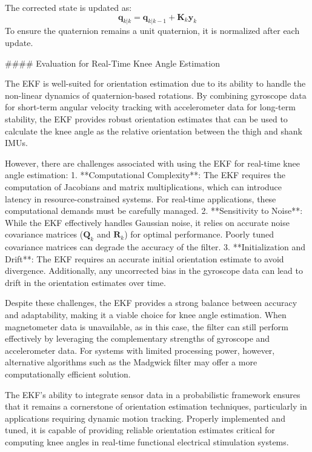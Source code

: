 The corrected state is updated as:
\[
\mathbf{q}_{k|k} = \mathbf{q}_{k|k-1} + \mathbf{K}_k \mathbf{y}_k
\]
To ensure the quaternion remains a unit quaternion, it is normalized after each update.

#### Evaluation for Real-Time Knee Angle Estimation

The EKF is well-suited for orientation estimation due to its ability to handle the non-linear dynamics of quaternion-based rotations. By combining gyroscope data for short-term angular velocity tracking with accelerometer data for long-term stability, the EKF provides robust orientation estimates that can be used to calculate the knee angle as the relative orientation between the thigh and shank IMUs.

However, there are challenges associated with using the EKF for real-time knee angle estimation:
1. **Computational Complexity**: The EKF requires the computation of Jacobians and matrix multiplications, which can introduce latency in resource-constrained systems. For real-time applications, these computational demands must be carefully managed.
2. **Sensitivity to Noise**: While the EKF effectively handles Gaussian noise, it relies on accurate noise covariance matrices (\( \mathbf{Q}_k \) and \( \mathbf{R}_k \)) for optimal performance. Poorly tuned covariance matrices can degrade the accuracy of the filter.
3. **Initialization and Drift**: The EKF requires an accurate initial orientation estimate to avoid divergence. Additionally, any uncorrected bias in the gyroscope data can lead to drift in the orientation estimates over time.

Despite these challenges, the EKF provides a strong balance between accuracy and adaptability, making it a viable choice for knee angle estimation. When magnetometer data is unavailable, as in this case, the filter can still perform effectively by leveraging the complementary strengths of gyroscope and accelerometer data. For systems with limited processing power, however, alternative algorithms such as the Madgwick filter may offer a more computationally efficient solution.

The EKF’s ability to integrate sensor data in a probabilistic framework ensures that it remains a cornerstone of orientation estimation techniques, particularly in applications requiring dynamic motion tracking. Properly implemented and tuned, it is capable of providing reliable orientation estimates critical for computing knee angles in real-time functional electrical stimulation systems.





